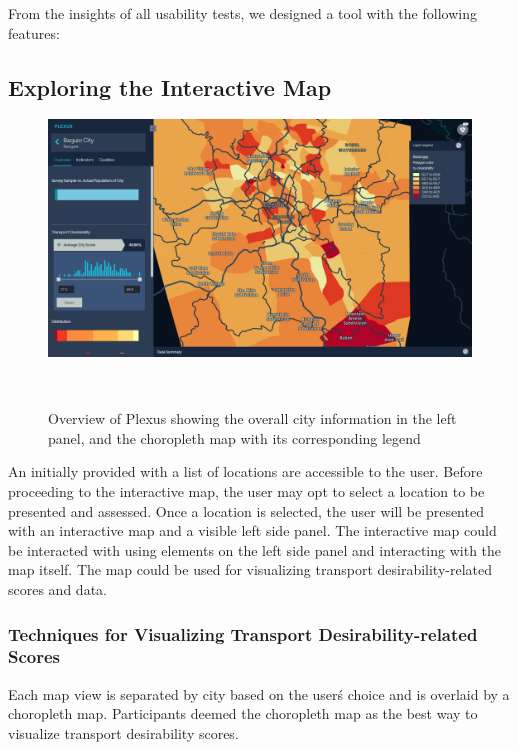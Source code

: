 \documentclass{sigchi}
\begin{document}
From the insights of all usability tests, we designed a tool with the following features: 

\subsection{Exploring the Interactive Map}


\begin{figure}
\centering
  \includegraphics[width=0.9\columnwidth]{figures/overview.PNG}
  \caption{Overview of Plexus showing the overall city information in the left panel, and the choropleth map with its corresponding legend }~\label{fig:KeplerInitialView}
\end{figure}

An initially provided with a list of locations are accessible to the user. Before proceeding to the interactive map, the user may opt to select a location to be presented and assessed. Once a location is selected, the user will be presented with an interactive map and a visible left side panel. The interactive map could be interacted with using elements on the left side panel and interacting with the map itself. The map could be used for visualizing transport desirability-related scores and data.

\subsubsection{Techniques for Visualizing Transport Desirability-related Scores}
Each map view is separated by city based on the user\'s choice and is overlaid by a choropleth map. Participants deemed the choropleth map as the best way to visualize transport desirability scores. 
\end{document}
